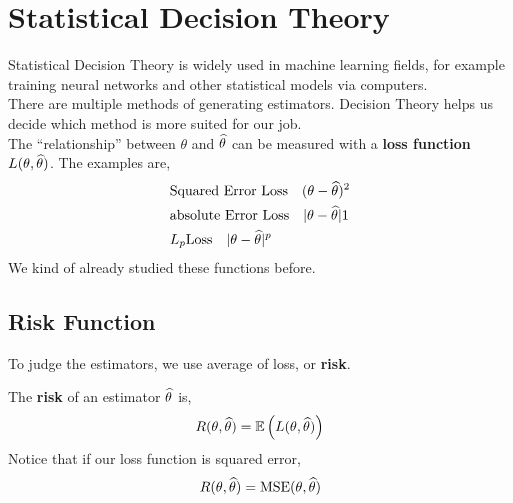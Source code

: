 \chapter{Statistical Decision Theory}
Statistical Decision Theory is widely used in machine learning fields, for example training neural networks and other statistical models via computers.\\ 
There are multiple methods of generating estimators. Decision Theory helps us decide which method is more suited for our job.\\
The ``relationship'' between $\theta$ and ${\widehat{\theta}}$ can be measured with a \textbf{loss function} $L(\theta, {\widehat{\theta}})$. The examples are,
\begin{align*}
        &\text{Squared Error Loss} \quad (\theta - {\widehat{\theta}})^2\\
        &\text{absolute Error Loss} \quad |\theta - {\widehat{\theta}}|1\\
        &L_p \text{Loss} \quad |\theta - {\widehat{\theta}}|^p
\end{align*}
We kind of already studied these functions before.
\section{Risk Function}
To judge the estimators, we use average of loss, or \textbf{risk}.
\begin{definition}
    The \textbf{risk} of an estimator ${\widehat{\theta}}$ is,
    \[ R(\theta, {\widehat{\theta}}) = {\mathbb{E}}\left(L(\theta, {\widehat{\theta}})\right)\]
    Notice that if our loss function is squared error,
    \[ R(\theta ,{\widehat{\theta}}) = \operatorname{MSE}(\theta,{\widehat{\theta}})\]
\end{definition}
